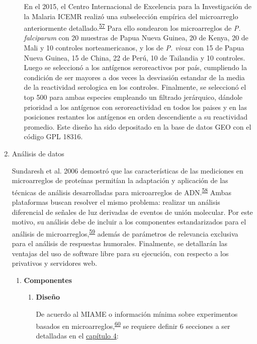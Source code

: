 \documentclass[]{article}
\begin{document}
\begin{enumerate}
\begin{enumerate}
    En el 2015, el Centro Internacional de Excelencia para la
    Investigación de la Malaria ICEMR realizó una subselección empírica
    del microarreglo anteriormente
    detallado.\textsuperscript{\protect\hyperlink{ref-King2015FOC}{57}}
    Para ello sondearon los microarreglos de \emph{P. falciparum} con 20
    muestras de Papua Nueva Guinea, 20 de Kenya, 20 de Mali y 10
    controles norteamericanos, y los de \emph{P. vivax} con 15 de Papua
    Nueva Guinea, 15 de China, 22 de Perú, 10 de Tailandia y 10
    controles. Luego se seleccionó a los antígenos seroreactivos por
    país, cumpliendo la condición de ser mayores a dos veces la
    desviasión estandar de la media de la reactividad serologica en los
    controles. Finalmente, se seleccionó el top 500 para ambas especies
    empleando un filtrado jerárquico, dándole prioridad a los antígenos
    con seroreactividad en todos los paises y en las posiciones
    restantes los antígenos en orden descendiente a su reactividad
    promedio. Este diseño ha sido depositado en la base de datos GEO con
    el código GPL 18316.
  \end{enumerate}
\item
  Análisis de datos

  Sundaresh et al. 2006 demostró que las características de las
  mediciones en microarreglos de proteínas permitían la adaptación y
  aplicación de las técnicas de análisis desarrolladas para
  microarreglos de
  ADN.\textsuperscript{\protect\hyperlink{ref-sundaresh2006}{58}} Ambas
  plataformas buscan resolver el mismo problema: realizar un análisis
  diferencial de señales de luz derivadas de eventos de unión molecular.
  Por este motivo, su análisis debe de incluir a los componentes
  estandarizados para el análisis de
  microarreglos,\textsuperscript{\protect\hyperlink{ref-allison2006}{59}}
  además de parámetros de relevancia exclusiva para el análisis de
  respuestas humorales. Finalmente, se detallarán las ventajas del uso
  de software libre para su ejecución, con respecto a los privativos y
  servidores web.

  \begin{enumerate}
  \def\labelenumii{\roman{enumii}.}
  \item
    \textbf{Componentes}

    \begin{enumerate}
    \def\labelenumiii{\arabic{enumiii}.}
    \item
      \textbf{Diseño}

      De acuerdo al MIAME o información mínima sobre experimentos
      basados en
      microarreglos,\textsuperscript{\protect\hyperlink{ref-brazma2001}{60}}
      se requiere definir 6 secciones a ser detalladas en el
      \protect\hyperlink{meto}{capítulo 4}:


\end{enumerate}
\end{enumerate}
\end{enumerate}
\end{document}
